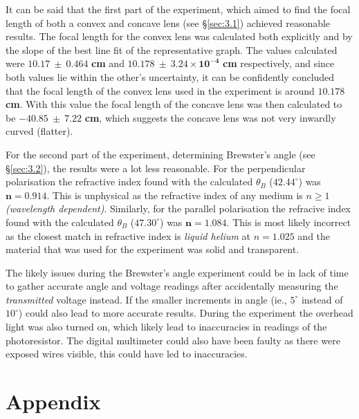\documentclass[12pt]{article}
\begin{document}
It can be said that the first part of the experiment, which aimed to find the focal length of both a convex and concave lens (see §\ref{sec:3.1}) achieved reasonable results. 
The focal length for the convex lens was calculated both explicitly and by the slope of the best line fit of the representative graph.
The values calculated were $\mathbf{10.17 \: \pm \: 0.464}$ \textbf{cm} and $\mathbf{10.178 \: \pm \: 3.24 \times 10^{-4}}$ \textbf{cm} \break respectively,
and since both values lie within the other's uncertainty, it can be confidently concluded that the focal length of the convex lens used in the experiment is around $\mathbf{10.178}$ \textbf{cm}.
With this value the focal length of the concave lens was then calculated to be $\mathbf{-40.85 \: \pm \: 7.22}$ \textbf{cm}, which suggests the concave lens was not very inwardly curved (flatter).

For the second part of the experiment, determining Brewster's angle (see §\ref{sec:3.2}), the results were a lot less reasonable.
For the perpendicular polarisation the refractive index found with the calculated $\theta_B$ ($\mathbf{42.44^{\circ}}$) was $\mathbf{n = 0.914}$. This is unphysical as the refractive index of any medium is $n \ge 1$ \textit{(wavelength dependent)}.
Similarly, for the parallel polarisation the refracive index found with the calculated $\theta_B$ ($\mathbf{47.30^{\circ}}$) was $\mathbf{n = 1.084}$. This is most likely incorrect as the closest match in refractive index is 
\textit{liquid helium} at $n=1.025$ \cite{liquidhe} and the material that was used for the experiment was solid and transparent.

The likely issues during the Brewster's angle experiment could be in lack of time to \break gather accurate angle and voltage readings after accidentally measuring the
\textit{transmitted} voltage instead. If the smaller increments in angle (ie., $5^{\circ}$ instead of $10^{\circ}$) could also lead to more accurate results.
During the experiment the overhead light was also turned on, which likely lead to inaccuracies in readings of the photoresistor.
The digital multimeter could also have been faulty as there were exposed wires visible, this could have led to inaccuracies.

\newpage



 \label{sec:ref}

\newpage

\section*{Appendix} \label{sec:A}
\end{document}
